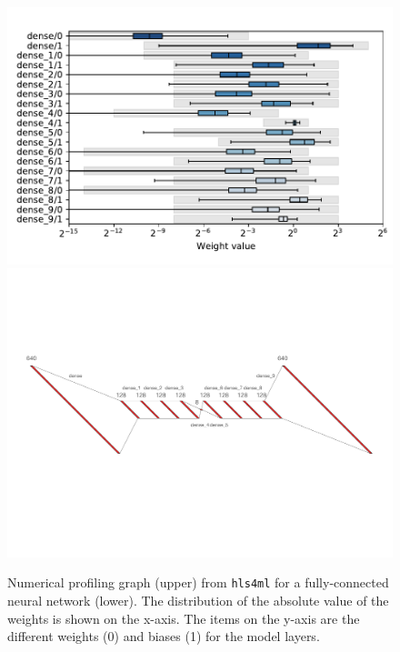 \documentclass[sigconf]{acmart}
\newcommand{\hlsfml}{\texttt{hls4ml}\xspace}
\begin{document}
\begin{figure}[t!]
\centering
\includegraphics[width=0.9\columnwidth]{Figs/slider_weights.pdf}
\includegraphics[width=0.9\columnwidth]{Figs/nn_mlp.pdf}
\caption{Numerical profiling graph (upper) from \hlsfml for a fully-connected neural network (lower). 
The distribution of the absolute value of the weights is shown on the x-axis.
The items on the y-axis are the different weights (0) and biases (1) for the model layers. }
\label{fig:profiling}
\end{figure}

\end{document}

